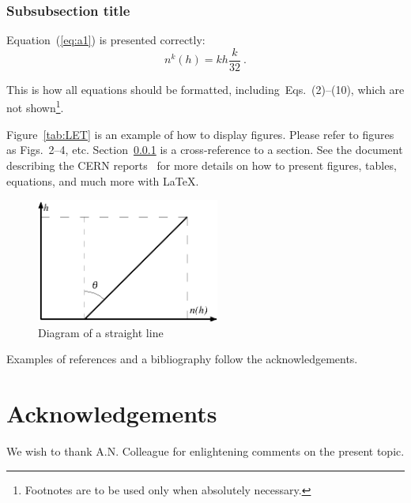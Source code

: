 \subsubsection{Subsubsection title}
\label{sec:sss}

Equation~(\ref{eq:a1}) is presented correctly:
\begin{equation}
n^k(h)= k h \frac{k}{32}~. \label{eq:a1}  
\end{equation}

This is how all equations should be formatted,
including~Eqs.~(2)--(10), 
which are not shown\footnote{Footnotes are
to be used only when absolutely necessary.}.


Figure~\ref{tab:LET} is an example of how to display figures. Please
refer to figures as Figs.~2--4, etc.
Section~\ref{sec:sss} is a cross-reference to a section. 
See the document describing the CERN reports~\cite{cernrep} for more
details on how to present figures, tables, equations, and much more
with \LaTeX. 

\begin{figure}[ht]
\begin{center}
\includegraphics[width=6cm]{pictexa}
\caption{Diagram of a straight line}
\label{fig:line}
\end{center}
\end{figure}

Examples of references and a bibliography follow the acknowledgements.

\section*{Acknowledgements}

We wish to thank A.N. Colleague for enlightening comments on
the present topic.

